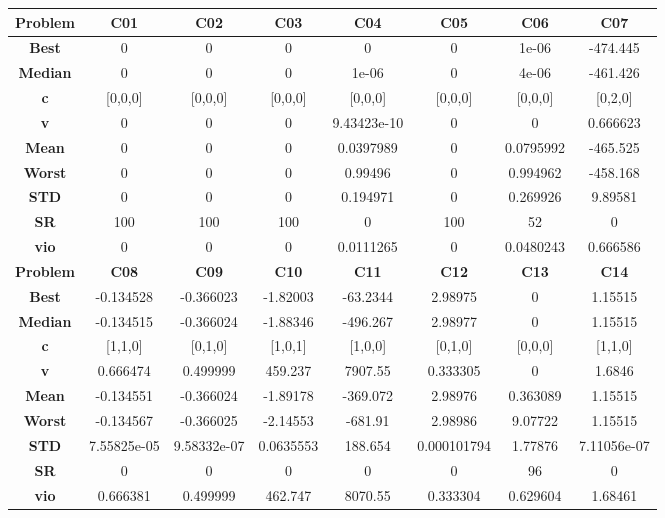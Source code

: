 \documentclass{IEEEtran}
\begin{document}
\begin{center} 
  \begin{tabular}{|c|c|c|c|c|c|c|c|}
    \hline 
    \textbf{Problem} & \textbf{C01} & \textbf{C02} & \textbf{C03} & \textbf{C04} & \textbf{C05} & \textbf{C06} & \textbf{C07} \\ 
    \hline\hline 
    \textbf{Best} & 0 & 0 & 0 & 0 & 0 & 1e-06 & -474.445\\ 
    \textbf{Median} & 0 & 0 & 0 & 1e-06 & 0 & 4e-06 & -461.426\\ 
    \textbf{c} & [0,0,0] & [0,0,0] & [0,0,0] & [0,0,0] & [0,0,0] & [0,0,0] & [0,2,0]\\ 
    \textbf{v} & 0 & 0 & 0 & 9.43423e-10 & 0 & 0 & 0.666623\\ 
    \textbf{Mean} & 0 & 0 & 0 & 0.0397989 & 0 & 0.0795992 & -465.525\\ 
    \textbf{Worst} & 0 & 0 & 0 & 0.99496 & 0 & 0.994962 & -458.168\\ 
    \textbf{STD} & 0 & 0 & 0 & 0.194971 & 0 & 0.269926 & 9.89581\\ 
    \textbf{SR} & 100 & 100 & 100 & 0 & 100 & 52 & 0\\ 
    \textbf{vio} & 0 & 0 & 0 & 0.0111265 & 0 & 0.0480243 & 0.666586\\ 
    \hline 
    \hline 
    \textbf{Problem} & \textbf{C08} & \textbf{C09} & \textbf{C10} & \textbf{C11} & \textbf{C12} & \textbf{C13} & \textbf{C14} \\ 
    \hline\hline 
    \textbf{Best} & -0.134528 & -0.366023 & -1.82003 & -63.2344 & 2.98975 & 0 & 1.15515\\ 
    \textbf{Median} & -0.134515 & -0.366024 & -1.88346 & -496.267 & 2.98977 & 0 & 1.15515\\ 
    \textbf{c} & [1,1,0] & [0,1,0] & [1,0,1] & [1,0,0] & [0,1,0] & [0,0,0] & [1,1,0]\\ 
    \textbf{v} & 0.666474 & 0.499999 & 459.237 & 7907.55 & 0.333305 & 0 & 1.6846\\ 
    \textbf{Mean} & -0.134551 & -0.366024 & -1.89178 & -369.072 & 2.98976 & 0.363089 & 1.15515\\ 
    \textbf{Worst} & -0.134567 & -0.366025 & -2.14553 & -681.91 & 2.98986 & 9.07722 & 1.15515\\ 
    \textbf{STD} & 7.55825e-05 & 9.58332e-07 & 0.0635553 & 188.654 & 0.000101794 & 1.77876 & 7.11056e-07\\ 
    \textbf{SR} & 0 & 0 & 0 & 0 & 0 & 96 & 0\\ 
    \textbf{vio} & 0.666381 & 0.499999 & 462.747 & 8070.55 & 0.333304 & 0.629604 & 1.68461\\ 

\end{tabular}
\end{center}
\end{document}
